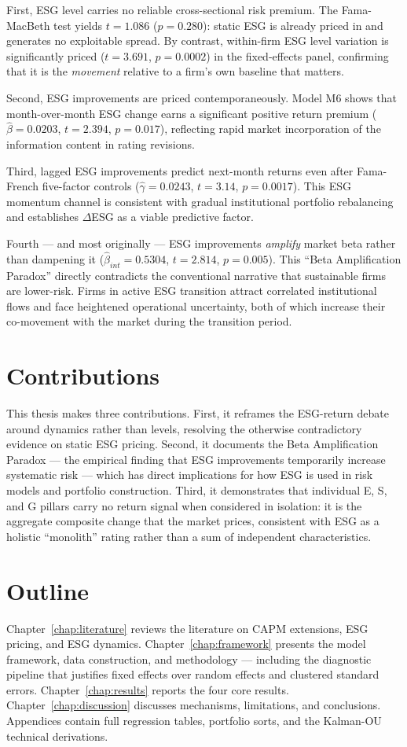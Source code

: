 First, ESG level carries no reliable cross-sectional risk premium. The Fama-MacBeth test yields $t = 1.086$ ($p = 0.280$): static ESG is already priced in and generates no exploitable spread. By contrast, within-firm ESG level variation is significantly priced ($t = 3.691$, $p = 0.0002$) in the fixed-effects panel, confirming that it is the \emph{movement} relative to a firm's own baseline that matters.

Second, ESG improvements are priced contemporaneously. Model M6 shows that month-over-month ESG change earns a significant positive return premium ($\hat{\beta} = 0.0203$, $t = 2.394$, $p = 0.017$), reflecting rapid market incorporation of the information content in rating revisions.

Third, lagged ESG improvements predict next-month returns even after Fama-French five-factor controls ($\hat{\gamma} = 0.0243$, $t = 3.14$, $p = 0.0017$). This ESG momentum channel is consistent with gradual institutional portfolio rebalancing and establishes $\Delta$ESG as a viable predictive factor.

Fourth --- and most originally --- ESG improvements \emph{amplify} market beta rather than dampening it ($\hat{\beta}_{int} = 0.5304$, $t = 2.814$, $p = 0.005$). This ``Beta Amplification Paradox'' directly contradicts the conventional narrative that sustainable firms are lower-risk. Firms in active ESG transition attract correlated institutional flows and face heightened operational uncertainty, both of which increase their co-movement with the market during the transition period.

\section{Contributions}

This thesis makes three contributions. First, it reframes the ESG-return debate around dynamics rather than levels, resolving the otherwise contradictory evidence on static ESG pricing. Second, it documents the Beta Amplification Paradox --- the empirical finding that ESG improvements temporarily increase systematic risk --- which has direct implications for how ESG is used in risk models and portfolio construction. Third, it demonstrates that individual E, S, and G pillars carry no return signal when considered in isolation: it is the aggregate composite change that the market prices, consistent with ESG as a holistic ``monolith'' rating rather than a sum of independent characteristics.

\section{Outline}

Chapter~\ref{chap:literature} reviews the literature on CAPM extensions, ESG pricing, and ESG dynamics. Chapter~\ref{chap:framework} presents the model framework, data construction, and methodology --- including the diagnostic pipeline that justifies fixed effects over random effects and clustered standard errors. Chapter~\ref{chap:results} reports the four core results. Chapter~\ref{chap:discussion} discusses mechanisms, limitations, and conclusions. Appendices contain full regression tables, portfolio sorts, and the Kalman-OU technical derivations.